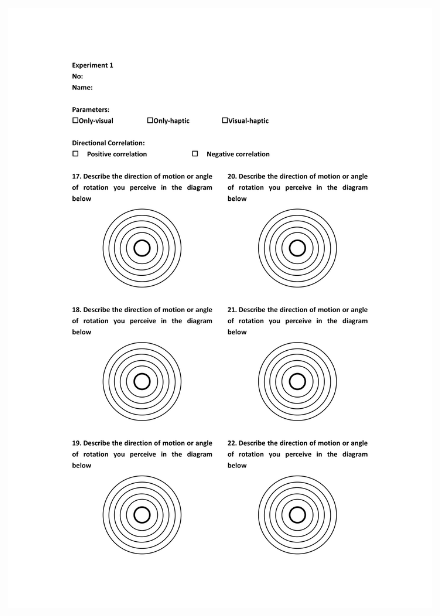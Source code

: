\begin{figure}[h]
\centering
\includegraphics[width=1\textwidth,height=0.7\textheight]{A_thesis/appendix/Experiment1_questionnaire-5.png}
\end{figure}
\newpage

